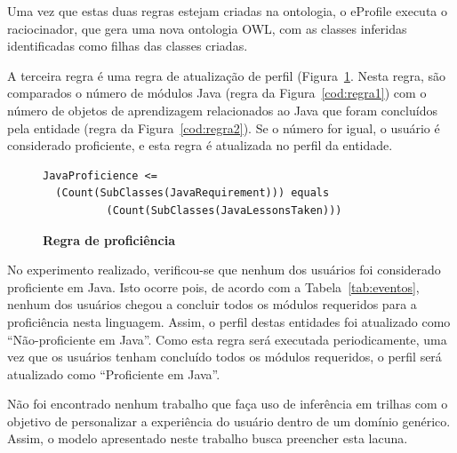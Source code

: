 \documentclass[times, 10pt, twocolumn]{article}
\begin{document}
Uma vez que estas duas regras estejam criadas na ontologia, o eProfile executa o raciocinador, que gera uma nova ontologia OWL, com as classes inferidas identificadas como filhas das classes criadas.

A terceira regra é uma regra de atualização de perfil (Figura~\ref{cod:regra3}. Nesta regra, são comparados o número de módulos Java (regra da Figura~\ref{cod:regra1}) com o número de objetos de aprendizagem relacionados ao Java que foram concluídos pela entidade (regra da Figura~\ref{cod:regra2}). Se o número for igual, o usuário é considerado proficiente, e esta regra é atualizada no perfil da entidade.

\begin{figure}
\begin{lstlisting}
JavaProficience <= 
  (Count(SubClasses(JavaRequirement))) equals
          (Count(SubClasses(JavaLessonsTaken)))
\end{lstlisting}
\caption{\textbf{Regra de proficiência}}
\label{cod:regra3}
\end{figure}

No experimento realizado, verificou-se que nenhum dos usuários foi considerado proficiente em Java. Isto ocorre pois, de acordo com a Tabela~\ref{tab:eventos}, nenhum dos usuários chegou a concluir todos os módulos requeridos para a proficiência nesta linguagem. Assim, o perfil destas entidades foi atualizado como ``Não-proficiente em Java''. Como esta regra será executada periodicamente, uma vez que os usuários tenham concluído todos os módulos requeridos, o perfil será atualizado como ``Proficiente em Java''.

\label{ch:relacionados}

Não foi encontrado nenhum trabalho que faça uso de inferência em trilhas com o objetivo de personalizar a experiência do usuário dentro de um domínio genérico. Assim, o modelo apresentado neste trabalho busca preencher esta lacuna. 
\end{document}
